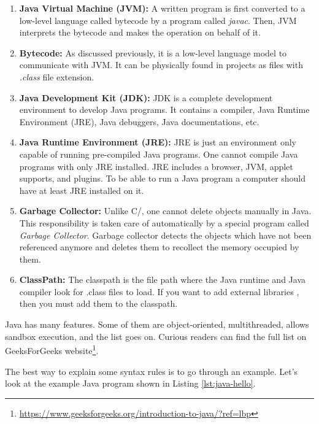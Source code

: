 \begin{enumerate}
    \item \textbf{Java Virtual Machine (JVM):} A written program is first converted to a low-level language called bytecode by a program called \emph{javac}. Then, JVM interprets the bytecode and makes the operation on behalf of it.
    
    \item \textbf{Bytecode:} As discussed previously, it is a low-level language model to communicate with JVM. It can be physically found in projects as files with \emph{.class} file extension.
    
    \item \textbf{Java Development Kit (JDK):} JDK is a complete development environment to develop Java programs. It contains a compiler, Java Runtime Environment (JRE), Java debuggers, Java documentations, etc.
    
    \item \textbf{Java Runtime Environment (JRE):} JRE is just an environment only capable of running pre-compiled Java programs. One cannot compile Java programs with only JRE installed. JRE includes a browser, JVM, applet supports, and plugins. To be able to run a Java program a computer should have at least JRE installed on it.
    
    \item \textbf{Garbage Collector:} Unlike C/\CC, one cannot delete objects manually in Java. This responsibility is taken care of automatically by a special program called \emph{Garbage Collector}. Garbage collector detects the objects which have not been referenced anymore and deletes them to recollect the memory occupied by them.
    
    \item \textbf{ClassPath:} The classpath is the file path where the Java runtime and Java compiler look for .class files to load. If you want to add external libraries , then you must add them to the classpath.
\end{enumerate}

Java has many features. Some of them are object-oriented, multithreaded, allows sandbox execution, and the list goes on. Curious readers can find the full list on GeeksForGeeks website\footnote{\url{https://www.geeksforgeeks.org/introduction-to-java/?ref=lbp}}.

The best way to explain some syntax rules is to go through an example. Let's look at the example Java program shown in Listing \ref{lst:java-hello}.

